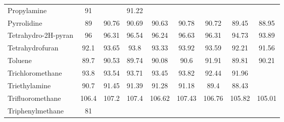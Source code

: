 \begin{longtable}{m{3.1cm} | c c c c c c c c}
 Propylamine                    &    91 &        &     91.22 &        &         &          &        &         \\
 Pyrrolidine                    &    89 &  90.76 &     90.69 &  90.63 &   90.78 &    90.72 &  89.45 &   88.95 \\
 Tetrahydro-2H-pyran            &    96 &  96.31 &     96.54 &  96.24 &   96.63 &    96.31 &  94.73 &   93.89 \\
 Tetrahydrofuran                &  92.1 &  93.65 &      93.8 &  93.33 &   93.92 &    93.59 &  92.21 &   91.56 \\
 Toluene                        &  89.7 &  90.53 &     89.74 &  90.08 &    90.6 &    91.91 &  89.81 &   90.21 \\
 Trichloromethane               &  93.8 &  93.54 &     93.71 &  93.45 &   93.82 &    92.44 &  91.96 &         \\
 Triethylamine                  &  90.7 &  91.45 &     91.39 &  91.28 &   91.18 &     89.4 &  88.43 &         \\
 Trifluoromethane               & 106.4 &  107.2 &     107.4 & 106.62 &  107.43 &   106.76 & 105.82 &  105.01 \\
 Triphenylmethane               &    81 &        &           &        &         &          &        &         \\
\end{longtable}
